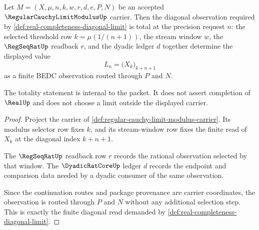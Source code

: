 \begin{theorem}
\label{thm:regular-cauchy-limit-modulus-diagonal-totality}
Let $M=(X,\mu,n,k,w,r,d,e,P,N)$ be an accepted $\RegularCauchyLimitModulusUp$ carrier. Then the diagonal observation required by \autoref{def:real-completeness-diagonal-limit} is total at the precision request $n$: the selected threshold row $k=\mu(1/(n+1))$, the stream window $w$, the $\RegSeqRatUp$ readback $r$, and the dyadic ledger $d$ together determine the displayed value
$$
L_n=\big(X_k\big)_{k+n+1}
$$
as a finite BEDC observation routed through $P$ and $N$.

The totality statement is internal to the packet. It does not assert completion of $\RealUp$ and does not choose a limit outside the displayed carrier.
\end{theorem}
\begin{proof}
Project the carrier of \autoref{def:regular-cauchy-limit-modulus-carrier}. Its modulus selector row fixes $k$, and its stream-window row fixes the finite read of $X_k$ at the diagonal index $k+n+1$.

The $\RegSeqRatUp$ readback row $r$ records the rational observation selected by that window. The $\DyadicRatCoreUp$ ledger $d$ records the endpoint and comparison data needed by a dyadic consumer of the same observation.

Since the continuation routes and package provenance are carrier coordinates, the observation is routed through $P$ and $N$ without any additional selection step. This is exactly the finite diagonal read demanded by \autoref{def:real-completeness-diagonal-limit}.
\end{proof}

